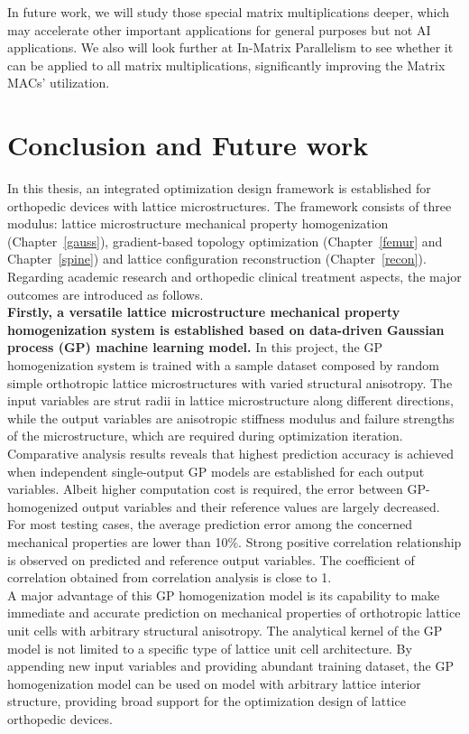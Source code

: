 \documentclass[12pt]{extbook}
\begin{document}
In future work, we will study those special matrix multiplications deeper, which may accelerate other important applications for general purposes but not AI applications. We also will look further at In-Matrix Parallelism to see whether it can be applied to all matrix multiplications, significantly improving the Matrix MACs' utilization.


\chapter{Conclusion and Future work}
\label{sec_5}

In this thesis, an integrated optimization design framework is established for orthopedic devices with lattice microstructures. The framework consists of three modulus: lattice microstructure mechanical property homogenization (Chapter~\ref{gauss}), gradient-based topology optimization (Chapter~\ref{femur} and Chapter~\ref{spine}) and lattice configuration reconstruction (Chapter~\ref{recon}). Regarding academic research and orthopedic clinical treatment aspects, the major outcomes are introduced as follows.\\

{\bf Firstly, a versatile lattice microstructure mechanical property homogenization system is established based on data-driven Gaussian process (GP) machine learning model.} In this project, the GP homogenization system is trained with a sample dataset composed by random simple orthotropic lattice microstructures with varied structural anisotropy. The input variables are strut radii in lattice microstructure along different directions, while the output variables are anisotropic stiffness modulus and failure strengths of the microstructure, which are required during optimization iteration.\\

Comparative analysis results reveals that highest prediction accuracy is achieved when independent single-output GP models are established for each output variables. Albeit higher computation cost is required, the error between GP-homogenized output variables and their reference values are largely decreased. For most testing cases, the average prediction error among the concerned mechanical properties are lower than 10\%. Strong positive correlation relationship is observed on predicted and reference output variables. The coefficient of correlation obtained from correlation analysis is close to 1.\\ 

A major advantage of this GP homogenization model is its capability to make immediate and accurate prediction on mechanical properties of orthotropic lattice unit cells with arbitrary structural anisotropy. The analytical kernel of the GP model is not limited to a specific type of lattice unit cell architecture. By appending new input variables and providing abundant training dataset, the GP homogenization model can be used on model with arbitrary lattice interior structure, providing broad support for the optimization design of lattice orthopedic devices.\\
\end{document}
